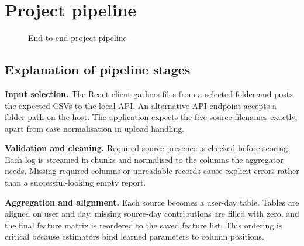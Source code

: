 \documentclass[12pt,a4paper,oneside]{report}
\begin{document}
\section{Project pipeline}
\begin{figure}[H]
\centering
{}
\caption{End-to-end project pipeline}
\label{fig:project-pipeline}
\end{figure}

\subsection{Explanation of pipeline stages}
\textbf{Input selection.} The React client gathers files from a selected
folder and posts the expected CSVs to the local API. An alternative
API endpoint accepts a folder path on the host. The application expects
the five source filenames exactly, apart from case normalisation in
upload handling.

\textbf{Validation and cleaning.} Required source presence is checked
before scoring. Each log is streamed in chunks and normalised to the
columns the aggregator needs. Missing required columns or unreadable
records cause explicit errors rather than a successful-looking empty
report.

\textbf{Aggregation and alignment.} Each source becomes a user-day
table. Tables are aligned on user and day, missing source-day
contributions are filled with zero, and the final feature matrix is
reordered to the saved feature list. This ordering is critical because
estimators bind learned parameters to column positions.
\end{document}
